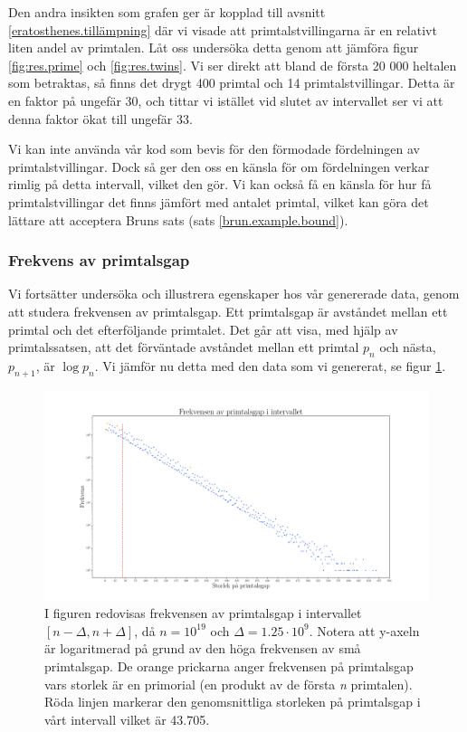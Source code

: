 Den andra insikten som grafen ger är kopplad till avsnitt \ref{eratosthenes.tillämpning} där vi visade att primtalstvillingarna är en relativt liten andel av primtalen.
Låt oss undersöka detta genom att jämföra figur \ref{fig:res.prime} och \ref{fig:res.twins}.
Vi ser direkt att bland de första 20 000 heltalen som betraktas, så finns det drygt 400 primtal och 14 primtalstvillingar. Detta är en faktor på ungefär 30, och tittar vi istället vid slutet av intervallet ser vi att denna faktor ökat till ungefär 33.

Vi kan inte använda vår kod som bevis för den förmodade fördelningen av primtalstvillingar. 
Dock så ger den oss en känsla för om fördelningen verkar rimlig på detta intervall, vilket den gör. Vi kan också få en känsla för hur få primtalstvillingar det finns jämfört med antalet primtal, vilket kan göra det lättare att acceptera Bruns sats (sats \ref{brun.example.bound}).


\subsubsection{Frekvens av primtalsgap}

Vi fortsätter undersöka och illustrera egenskaper hos vår genererade data, genom att studera frekvensen av primtalsgap. 
Ett primtalsgap är avståndet mellan ett primtal och det efterföljande primtalet.
Det går att visa, med hjälp av primtalssatsen, att det förväntade avståndet mellan ett primtal \(p_n\) och nästa, \(p_{n+1}\), är \(\log p_n\).
Vi jämför nu detta med den data som vi genererat, se figur \ref{fig:res.gap}.

\begin{figure}[h]
    \centering
    \includegraphics[width = \textwidth]{coen/Images/GapsNoKapps.pdf}
    \caption{I figuren redovisas frekvensen av primtalsgap i intervallet \([n-\Delta,n+\Delta]\), då \(n = 10^{19}\) och \(\Delta = 1.25\cdot10^{9}\). Notera att y-axeln är logaritmerad på grund av den höga frekvensen av små primtalsgap. 
    De orange prickarna anger frekvensen på primtalsgap vars storlek är en primorial (en produkt av de första \textit{n} primtalen).
    Röda linjen markerar den genomsnittliga storleken på primtalsgap i vårt intervall vilket är 43.705.}
    \label{fig:res.gap}
\end{figure}


